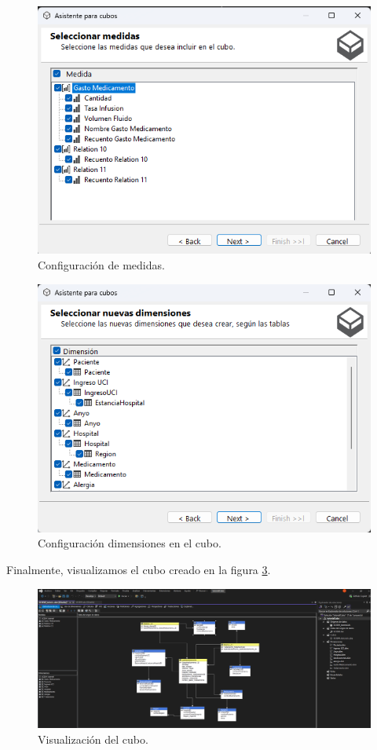 \documentclass{article}
\begin{document}
\begin{figure}[H]
	\begin{center} 
		\includegraphics[width=.7\textwidth]{images/medidas2.png} 
		\caption{Configuración de medidas.}
		\label{fig:medidas}
	\end{center}
\end{figure}
\begin{figure}[H]
	\begin{center} 
		\includegraphics[width=.7\textwidth]{images/dimensiones.png} 
		\caption{Configuración dimensiones en el cubo.}
		\label{fig:dimensiones}
	\end{center}
\end{figure}

Finalmente, visualizamos el cubo creado en la figura \ref{fig:cubo_vista}.

\begin{figure}[H]
	\begin{center} 
		\includegraphics[width=.9\textwidth]{images/cubo_vista.png} 
		\caption{Visualización del cubo.}
		\label{fig:cubo_vista}
	\end{center}
\end{figure}
\end{document}
